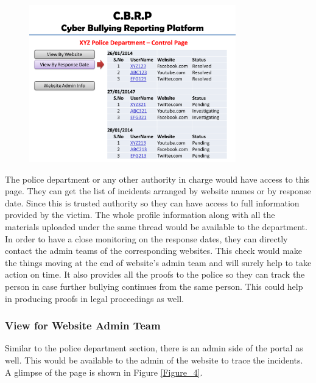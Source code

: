 \begin{figure}[h]
\centering
\includegraphics[width=0.8\textwidth]{images/Figure_3}
\caption{}
\label{Figure_3}
\end{figure}



The police department or any other authority in charge would have access to this page. They can get the list of incidents arranged by website names or by response date. Since this is trusted authority so they can have access to full information provided by the victim. The whole profile information along with all the materials uploaded under the same thread would be available to the department. In order to have a close monitoring on the response dates, they can directly contact the admin teams of the corresponding websites. This check would make the things moving at the end of website’s admin team and will surely help to take action on time.  It also provides all the proofs to the police so they can track the person in case further bullying continues from the same person. This could help in producing proofs in legal proceedings as well.

\subsubsection{View for Website Admin Team}
Similar to the police department section, there is an admin side of the portal as well. This would be available to the admin of the website to trace the incidents. A glimpse of the page is shown in Figure \ref{Figure_4}. 

